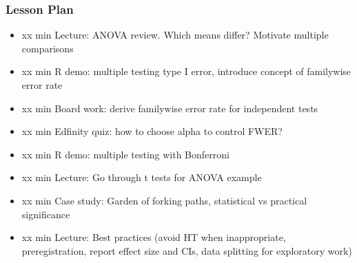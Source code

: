 \begin{frame}
    \frametitle{Lesson Plan}
    \begin{itemize}
        \item xx min Lecture: ANOVA review. Which means differ? Motivate multiple comparisons
        \item xx min R demo: multiple testing type I error, introduce concept of familywise error rate
        \item xx min Board work: derive familywise error rate for independent tests
        \item xx min Edfinity quiz: how to choose alpha to control FWER?
        \item xx min R demo: multiple testing with Bonferroni
        \item xx min Lecture: Go through t tests for ANOVA example
        \item xx min Case study: Garden of forking paths, statistical vs practical significance
        \item xx min Lecture: Best practices (avoid HT when inappropriate, preregistration, report effect size and CIs, data splitting for exploratory work)
    \end{itemize}
\end{frame}


